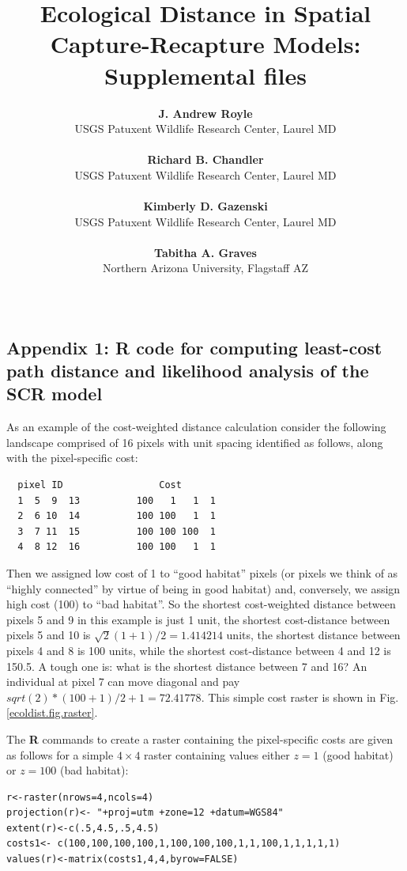 \documentclass[12pt]{article}
\title{Ecological Distance in Spatial Capture-Recapture Models: Supplemental 
files}
\author{
{\bf J. Andrew Royle}\\
USGS Patuxent Wildlife Research Center, Laurel MD \\ \\
{\bf Richard B. Chandler} \\
USGS Patuxent Wildlife Research Center, Laurel MD\\ \\
{\bf Kimberly D. Gazenski} \\
USGS Patuxent Wildlife Research Center, Laurel MD\\ \\
{\bf Tabitha A. Graves} \\
Northern Arizona University, Flagstaff AZ \\ \\
}
\begin{document}
\maketitle

\date

\newpage

\linenumbers


\begin{spacing}{1.2}



\section*{Appendix 1: {\bf R} code for computing least-cost path
  distance and likelihood analysis of the SCR model}


As an example of the cost-weighted distance calculation consider the
following landscape comprised of 16 pixels with unit spacing
identified as follows, along with the pixel-specific cost:
\begin{center}
\begin{verbatim}
  pixel ID                 Cost
  1  5  9  13          100   1   1  1
  2  6 10  14          100 100   1  1
  3  7 11  15          100 100 100  1
  4  8 12  16          100 100   1  1
\end{verbatim}
\end{center}
Then we assigned low cost of 1 to ``good habitat'' pixels (or pixels
we think of as ``highly connected'' by virtue of being in good
habitat) and, conversely, we assign high cost (100) to ``bad
habitat''. So the shortest cost-weighted distance between pixels 5 and
9 in this example is just 1 unit, the shortest cost-distance between
pixels 5 and 10 is $\sqrt{2}(1+1)/2 = 1.414214$ units, the shortest
distance between pixels 4 and 8 is 100 units, while the shortest
cost-distance between 4 and 12 is 150.5. A tough one is: what is the
shortest distance between 7 and 16? An individual at pixel 7 can move
diagonal and pay $sqrt(2)*(100+1)/2 + 1 =72.41778$.  This simple cost
raster is shown in Fig. \ref{ecoldist.fig.raster}.

The {\bf R} commands to create a raster containing the pixel-specific
costs are given as follows for a simple $4\times 4$ raster containing
values either $z=1$ (good habitat) or $z=100$ (bad habitat):
\begin{verbatim}
r<-raster(nrows=4,ncols=4)
projection(r)<- "+proj=utm +zone=12 +datum=WGS84"
extent(r)<-c(.5,4.5,.5,4.5)
costs1<- c(100,100,100,100,1,100,100,100,1,1,100,1,1,1,1,1)
values(r)<-matrix(costs1,4,4,byrow=FALSE)
\end{verbatim}



\end{spacing}
\end{document}
